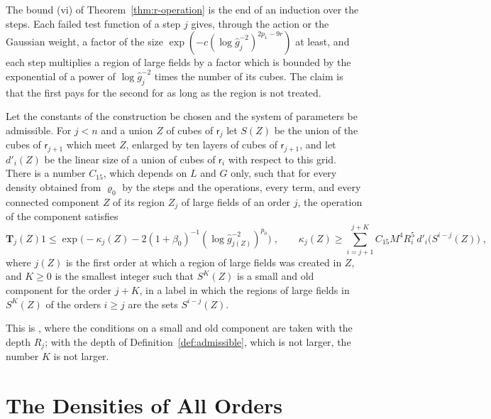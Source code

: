 \documentclass[11pt]{preprint}
\numberwithin{equation}{section}
\begin{document}
The bound (vi) of Theorem~\ref{thm:r-operation} is the end of an induction over the steps. Each failed test function of a step $j$ gives, through the action or the Gaussian weight, a factor of the size $\exp(-c(\log\hat g_j^{-2})^{2p_1 - 9r})$ at least, and each step multiplies a region of large fields by a factor which is bounded by the exponential of a power of $\log\hat g_j^{-2}$ times the number of its cubes. The claim is that the first pays for the second for as long as the region is not treated.

\begin{proposition}\label{prop:large-field-factors}
Let the constants of the construction be chosen and the system of parameters be admissible. For $j < n$ and a union $Z$ of cubes of $\mathsf r_j$ let $S(Z)$ be the union of the cubes of $\mathsf r_{j+1}$ which meet $Z$, enlarged by ten layers of cubes of $\mathsf r_{j+1}$, and let $d'_i(Z)$ be the linear size of a union of cubes of $\mathsf r_i$ with respect to this grid. There is a number $C_{15}$, which depends on $L$ and $G$ only, such that for every density obtained from $\varrho_0$ by the steps and the operations, every term, and every connected component $Z$ of its region $Z_j$ of large fields of an order $j$, the operation of the component satisfies
\begin{equation}\label{eq:large-field-factor}
    \mathbf T_j(Z)1 \leqslant \exp\bigl(-\kappa_j(Z) - 2(1 + \beta_0)^{-1}(\log\hat g_{j(Z)}^{-2})^{p_0}\bigr)\;,
    \qquad
    \kappa_j(Z) \geqslant \sum_{i=j+1}^{j+K}C_{15}M^4R_i^5\,d'_i\bigl(S^{i-j}(Z)\bigr)\;,
\end{equation}
where $j(Z)$ is the first order at which a region of large fields was created in $Z$, and $K \geqslant 0$ is the smallest integer such that $S^K(Z)$ is a small and old component for the order $j + K$, in a label in which the regions of large fields in $S^K(Z)$ of the orders $i \geqslant j$ are the sets $S^{i-j}(Z)$.
\end{proposition}

This is \cite[(1.79)--(1.89), pp.~383--387]{BalabanLFR2}, where the conditions on a small and old component are taken with the depth $R_j$; with the depth of Definition~\ref{def:admissible}, which is not larger, the number $K$ is not larger.

\section{The Densities of All Orders}\label{sec:inductive}
\end{document}
